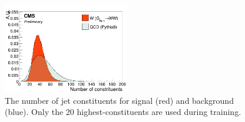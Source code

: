 \begin{figure}[h!]
\centering
\includegraphics[width=0.49\textwidth]{figures/vtagging/AN-18-099/input/inputs/sig-bkg/nconst.png}
\caption{The number of jet constituents for signal (red) and background (blue). Only the 20 highest-\PT constituents are used during training.}
\label{fig:lola:nconst}
\end{figure}

